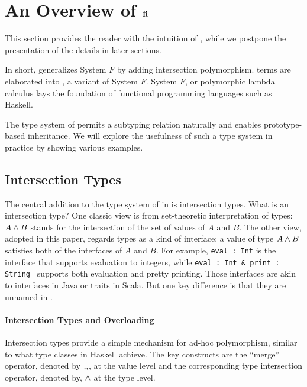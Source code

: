 \section{An Overview of $ {\bf fi} $}


This section provides the reader with the intuition of \name, while we
postpone the presentation of the details in later sections.

In short, \name generalizes System $ F $ by adding intersection
polymorphism. \name terms are elaborated into \Target, a variant of
System $ F $. System $ F $, or polymorphic lambda calculus lays the
foundation of functional programming languages such as Haskell.

The type system of \name permits a subtyping relation naturally and
enables prototype-based inheritance. We will explore the usefulness of
such a type system in practice by showing various examples.

\subsection{Intersection Types}

The central addition to the type system of \target in \name is
intersection types. 
What is an intersection type? One classic view is
from set-theoretic interpretation of types: $ A \wedge B $ stands
for the intersection of the set of values of $ A $ and $ B $. The
other view, adopted in this paper, regards types as a kind of
interface: a value of type $ A \wedge B $ satisfies both of the
interfaces of $ A $ and $ B $. For example, \lstinline{eval : Int} is
the interface that supports evaluation to integers, while
\lstinline{eval : Int & print : String } 
supports both evaluation and pretty
printing. Those interfaces are akin to interfaces in Java or traits in
Scala. But one key difference is that they are unnamed in \name.

\paragraph{Intersection Types and Overloading}
Intersection types provide a simple mechanism for ad-hoc polymorphism, similar
to what type classes in Haskell achieve. The key constructs are the ``merge''
operator, denoted by $ ,\!, $, at the value level and the corresponding type
intersection operator, denoted by, $ \wedge $ at the type
level.

